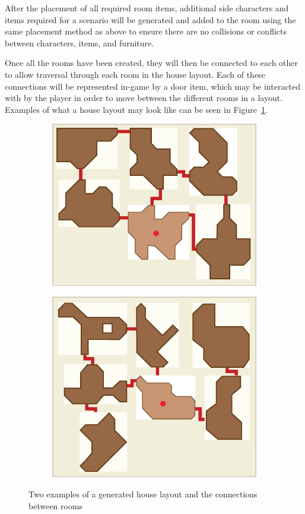 After the placement of all required room items, additional side characters and items required for a scenario will be generated and added to the room using the same placement method as above to ensure there are no collisions or conflicts between characters, items, and furniture.

Once all the rooms have been created, they will then be connected to each other to allow traversal through each room in the house layout. Each of these connections will be represented in-game by a door item, which may be interacted with by the player in order to move between the different rooms in a layout. Examples of what a house layout may look like can be seen in  Figure~\ref{fig:house_map_example}.

\begin{figure}[htb]
	\centering %
	\begin{subfigure}{.45\textwidth}
		\centering
		\includegraphics[width=.9\linewidth]{images/RoomGeneration_HouseMapExample1}
	\end{subfigure}%
	\begin{subfigure}{.45\textwidth}
		\centering
		\includegraphics[width=.9\linewidth]{images/RoomGeneration_HouseMapExample2}
	\end{subfigure}
	 \caption{Two examples of a generated house layout and the connections between rooms}
	 \label{fig:house_map_example}
\end{figure}

